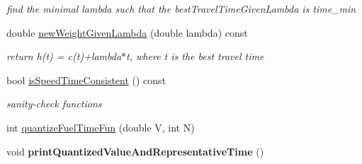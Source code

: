 \begin{DoxyCompactItemize}
\begin{DoxyCompactList}\small\item\em find the minimal lambda such that the best\+Travel\+Time\+Given\+Lambda is time\+\_\+min \end{DoxyCompactList}\item 
\hypertarget{class_p_a_s_o_edge_data_a33786ae471fac7b749c5a5093f48e157}{}double \hyperlink{class_p_a_s_o_edge_data_a33786ae471fac7b749c5a5093f48e157}{new\+Weight\+Given\+Lambda} (double lambda) const \label{class_p_a_s_o_edge_data_a33786ae471fac7b749c5a5093f48e157}

\begin{DoxyCompactList}\small\item\em return h(t) = c(t)+lambda$\ast$t, where t is the best travel time \end{DoxyCompactList}\item 
\hypertarget{class_p_a_s_o_edge_data_a11dc421d1bf8afe4dbd30c9d440e2e8a}{}bool \hyperlink{class_p_a_s_o_edge_data_a11dc421d1bf8afe4dbd30c9d440e2e8a}{is\+Speed\+Time\+Consistent} () const \label{class_p_a_s_o_edge_data_a11dc421d1bf8afe4dbd30c9d440e2e8a}

\begin{DoxyCompactList}\small\item\em sanity-\/check functions \end{DoxyCompactList}\item 
int \hyperlink{class_p_a_s_o_edge_data_a92dbf05f014175a2a14a8f708f525c0a}{quantize\+Fuel\+Time\+Fun} (double V, int N)
\item 
\hypertarget{class_p_a_s_o_edge_data_a767ae02f578d92cb22366d8b5cbefae4}{}void {\bfseries print\+Quantized\+Value\+And\+Representative\+Time} ()\label{class_p_a_s_o_edge_data_a767ae02f578d92cb22366d8b5cbefae4}

\end{DoxyCompactItemize}
